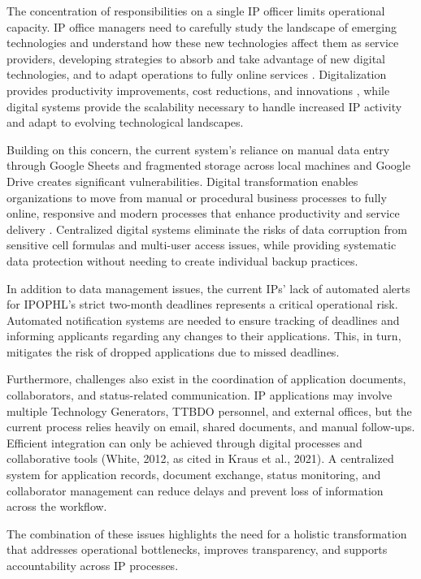 The concentration of responsibilities on a single IP officer limits operational capacity. IP office managers need to carefully study the landscape of emerging technologies and understand how these new technologies affect them as service providers, developing strategies to absorb and take advantage of new digital technologies, and to adapt operations to fully online services \citep{wipoIPOBSD}. Digitalization provides productivity improvements, cost reductions, and innovations \citep{kraus2021digital}, while digital systems provide the scalability necessary to handle increased IP activity and adapt to evolving technological landscapes.

Building on this concern, the current system’s reliance on manual data entry through Google Sheets and fragmented storage across local machines and Google Drive creates significant vulnerabilities. Digital transformation enables organizations to move from manual or procedural business processes to fully online, responsive and modern processes that enhance productivity and service delivery \citep{wipoIPOBSD}. Centralized digital systems eliminate the risks of data corruption from sensitive cell formulas and multi-user access issues, while providing systematic data protection without needing to create individual backup practices.

In addition to data management issues, the current IPs’ lack of automated alerts for IPOPHL's strict two-month deadlines represents a critical operational risk. Automated notification systems are needed to ensure tracking of deadlines and informing applicants regarding any changes to their applications. This, in turn, mitigates the risk of dropped applications due to missed deadlines.

Furthermore, challenges also exist in the coordination of application documents, collaborators, and status-related communication. IP applications may involve multiple Technology Generators, TTBDO personnel, and external offices, but the current process relies heavily on email, shared documents, and manual follow-ups. Efficient integration can only be achieved through digital processes and collaborative tools (White, 2012, as cited in Kraus et al., 2021). A centralized system for application records, document exchange, status monitoring, and collaborator management can reduce delays and prevent loss of information across the workflow.

The combination of these issues highlights the need for a holistic transformation that addresses operational bottlenecks, improves transparency, and supports accountability across IP processes.

